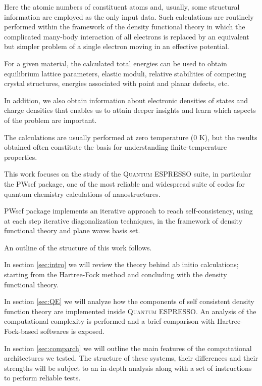 \documentclass[a4paper,12pt]{article}
\newcommand\QE{\textsc{Quantum} ESPRESSO }
\begin{document}
Here the atomic numbers of constituent atoms and, usually, some structural information are employed as the only input data.
Such calculations are routinely performed within the framework of the density functional theory in which the complicated many-body interaction of all electrons is replaced by an equivalent but simpler problem of a single electron moving  in  an  effective  potential.

For  a  given  material, the calculated total energies can be used to obtain equilibrium lattice parameters, elastic moduli, relative stabilities of competing crystal structures, energies associated with point
and planar defects, etc. 

In addition, we also obtain information  about  electronic  densities  of  states  and  charge  densities that enables us to attain deeper insights and learn which aspects of the problem are important.

The calculations are usually  performed  at  zero  temperature  (0 K),  but  the  results  obtained  often  constitute  the  basis  for  understanding finite-temperature properties.

This work focuses on the study of the \QE suite, in particular the PWscf package,  one of the most reliable and widespread  suite of codes for quantum chemistry calculations of nanostructures.

PWscf package implements an iterative approach to reach self-consistency, using at each step iterative diagonalization techniques, in the framework of density functional theory and plane waves basis set.

An outline of the structure of this work follows.

In section \ref{sec:intro} we will review the theory behind ab initio calculations; starting from the Hartree-Fock method and concluding with the density functional theory.

In section \ref{sec:QE} we will analyze how the components of self consistent density function theory are implemented inside \textsc{Quantum} ESPRESSO. 
An analysis of the computational complexity is performed and a brief comparison with Hartree-Fock-based softwares is exposed.

In section \ref{sec:comparch} we will outline the main features of the computational architectures we tested.
The structure of these systems, their differences and their strengths will be subject to an in-depth analysis along with a set of instructions to perform reliable tests.
\end{document}
